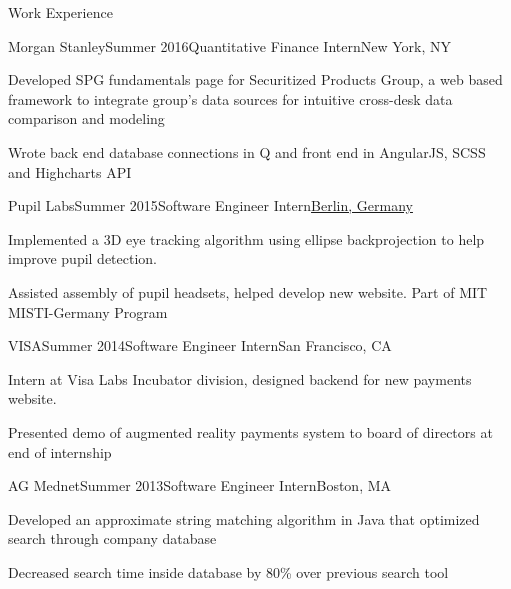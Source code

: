 \documentclass{resume} %
\begin{document}
\begin{rSection}{Work Experience}

\begin{rSubsection}{Morgan Stanley}{Summer 2016}{Quantitative Finance Intern}{New York, NY}
\item Developed SPG fundamentals page for Securitized Products Group, a web based framework to integrate group's data sources for intuitive cross-desk data comparison and modeling
\item Wrote back end database connections in Q and front end in AngularJS, SCSS and Highcharts API
\end{rSubsection}


\begin{rSubsection}{Pupil Labs}{Summer 2015}{Software Engineer Intern}{\underline{Berlin, Germany}}
\item Implemented a 3D eye tracking algorithm using ellipse backprojection to help improve pupil detection.
\item Assisted assembly of pupil headsets, helped develop new website. Part of MIT MISTI-Germany Program
\end{rSubsection}


\begin{rSubsection}{VISA}{Summer 2014}{Software Engineer Intern}{San Francisco, CA}
\item Intern at Visa Labs Incubator division, designed backend for new payments website. 
\item Presented demo of augmented reality payments system to board of directors at end of internship
\end{rSubsection}


\begin{rSubsection}{AG Mednet}{Summer 2013}{Software Engineer Intern}{Boston, MA}
\item Developed an approximate string matching algorithm in Java that optimized search through company database
\item Decreased search time inside database by 80\% over previous search tool
\end{rSubsection}


\end{rSection}
\end{document}

